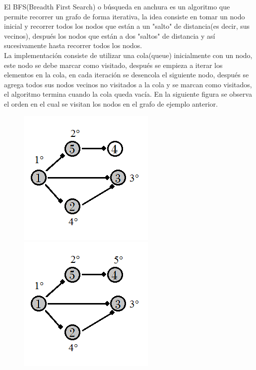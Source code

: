 \documentclass[12pt, a4paper]{article}
\begin{document}
	El BFS(Breadth First Search) o búsqueda en anchura es un algoritmo que permite recorrer un grafo de forma
	iterativa, la idea consiste en tomar un nodo inicial y recorrer todos los nodos que están a un "salto" de 
	distancia(es decir, sus vecinos), después los nodos que están a dos "saltos" de distancia y así sucesivamente hasta
	recorrer todos los nodos.\\
	
	La implementación consiste de utilizar una cola(queue) inicialmente con un nodo, este nodo se debe marcar como
	visitado, después se empieza a iterar los elementos en la cola, en cada iteración se desencola el siguiente nodo,
	después se agrega todos sus nodos vecinos no visitados a la cola y se marcan como visitados, el algoritmo termina
	cuando la cola queda vacía. En la siguiente figura se observa el orden en el cual se visitan los nodos en el grafo
	de ejemplo anterior.
	
	\begin{figure}[!htb]
			\centering
			\includegraphics[scale=1]{Grafos/imagenes/DFS_y_BFS/BFS1}
			\caption{}
			\label{grafos:DFS_y_BFS:BFS1}
		\endminipage
			\centering
			\includegraphics[scale=1]{Grafos/imagenes/DFS_y_BFS/BFS2}
			\caption{}
			\label{grafos:DFS_y_BFS:BFS2}
		\endminipage
	\end{figure}	
	
\end{document}

